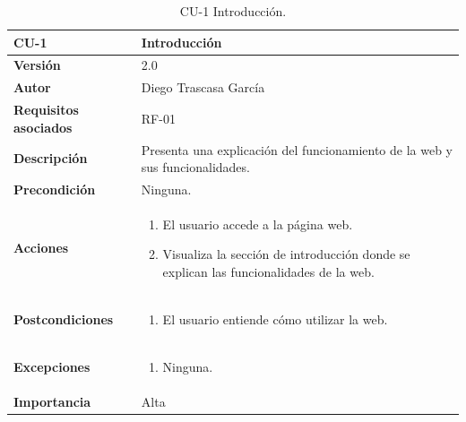 \begin{table}[p]
	\centering
	\begin{tabularx}{\linewidth}{ p{} p{} }
		\toprule
		\textbf{CU-1}    & \textbf{Introducción}\\
		\toprule
		\textbf{Versión}              & 2.0    \\
		\textbf{Autor}                & Diego Trascasa García \\
		\textbf{Requisitos asociados} & RF-01 \\
		\textbf{Descripción}          & Presenta una explicación del funcionamiento de la web y sus funcionalidades. \\
		\textbf{Precondición}         & Ninguna. \\
		\textbf{Acciones}             &
		\begin{enumerate}
			\item El usuario accede a la página web.
			\item Visualiza la sección de introducción donde se explican las funcionalidades de la web.
		\end{enumerate}\\
		\textbf{Postcondiciones}      & 
		\begin{enumerate}
			\item El usuario entiende cómo utilizar la web.
		\end{enumerate}\\
		\textbf{Excepciones}          & 
		\begin{enumerate}
			\item Ninguna.
		\end{enumerate}\\
		\textbf{Importancia}          & Alta \\
		\bottomrule
	\end{tabularx}
	\caption{CU-1 Introducción.}
    \label{CU-1}
\end{table}

